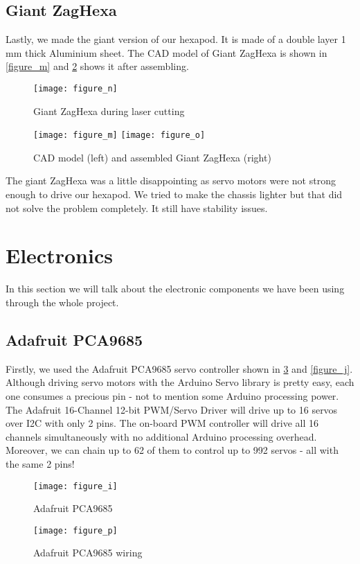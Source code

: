 \subsection{Giant ZagHexa}
Lastly, we made the giant version of our hexapod. It is made of a double layer 1 mm thick Aluminium sheet. The CAD model of Giant ZagHexa is shown in \ref{figure_m} and \ref{figure_o} shows it after assembling.
\begin{figure}[h]
	\centering
	\texttt{[image: figure\_n]}
	\caption{Giant ZagHexa during laser cutting}
	\label{figure_n}
\end{figure}
\begin{figure}[h]
	\centering
    	\texttt{[image: figure\_m]}
	\texttt{[image: figure\_o]}
	\caption{CAD model (left) and assembled Giant ZagHexa (right)}
	\label{figure_o}
\end{figure}
The giant ZagHexa was a little disappointing as servo motors were not strong enough to drive our hexapod. We tried to make the chassis lighter but that did not solve the problem completely. It still have stability issues.

\section{Electronics}
In this section we will talk about the electronic components we have been using through the whole project.

\subsection{Adafruit PCA9685}
Firstly, we used the Adafruit PCA9685 servo controller shown in \ref{figure_i} and \ref{figure_j}. Although driving servo motors with the Arduino Servo library is pretty easy, each one consumes a precious pin - not to mention some Arduino processing power.  The Adafruit 16-Channel 12-bit PWM/Servo Driver will drive up to 16 servos over I2C with only 2 pins.  The on-board PWM controller will drive all 16 channels simultaneously with no additional Arduino processing overhead.  Moreover, we can chain up to 62 of them to control up to 992 servos - all with the same 2 pins!

\begin{figure}[h]
	\centering
	\texttt{[image: figure\_i]}
	\caption{Adafruit PCA9685}
	\label{figure_i}
\end{figure}

\begin{figure}[h]
	\centering
	\texttt{[image: figure\_p]}
	\caption{Adafruit PCA9685 wiring}
	\label{figure_p}
\end{figure}
